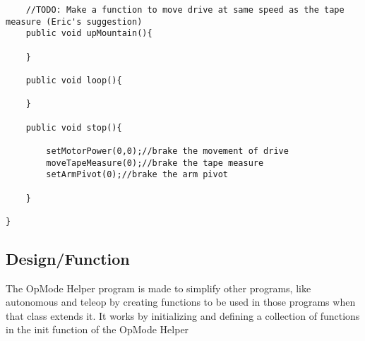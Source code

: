 \documentclass[11pt,fleqn]{article}
\begin{document}
\begin{verbatim}
    //TODO: Make a function to move drive at same speed as the tape measure (Eric's suggestion)
    public void upMountain(){

    }

    public void loop(){

    }

    public void stop(){

        setMotorPower(0,0);//brake the movement of drive
        moveTapeMeasure(0);//brake the tape measure
        setArmPivot(0);//brake the arm pivot

    }

}

\end{verbatim}

\subsection*{Design/Function}

The OpMode Helper program is made to simplify other programs, like autonomous and teleop by creating
functions to be used in those programs when that class extends it. It works by initializing and
defining a collection of functions in the init function of the OpMode Helper
\end{document}
